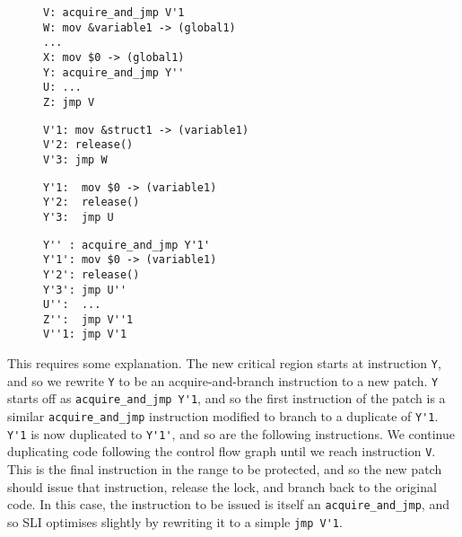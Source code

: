 \documentclass[10pt,twocolumn,preprint,natbib,authoryear]{sigplanconf}
\makeatletter
\newenvironment{subfloat}%
    {\def\caption##1{\gdef\subcapsave{\relax##1}}%
     \let\subcapsave=\@empty %
     \let\sf@oldlabel=\label
     \def\label##1{\xdef\sublabsave{\noexpand\label{##1}}}%
     \let\sublabsave\relax    %
     \setbox\subfigbox\hbox
       \bgroup}%
      {\egroup                %
     \let\label=\sf@oldlabel
     \subfigure[\subcapsave]{\box\subfigbox}}%
\makeatother
\begin{document}
\begin{figure}[h]
  \begin{subfloat}
    \begin{minipage}{90mm}
\begin{verbatim}
V: acquire_and_jmp V'1
W: mov &variable1 -> (global1)
...
X: mov $0 -> (global1)
Y: acquire_and_jmp Y''
U: ...
Z: jmp V
\end{verbatim}
    \end{minipage}
  \end{subfloat}
  \begin{subfloat}
    \begin{minipage}{90mm}
\begin{verbatim}
V'1: mov &struct1 -> (variable1)
V'2: release()
V'3: jmp W
\end{verbatim}
    \end{minipage}
  \end{subfloat}
  \begin{subfloat}
    \begin{minipage}{90mm}
\begin{verbatim}
Y'1:  mov $0 -> (variable1)
Y'2:  release()
Y'3:  jmp U
\end{verbatim}
    \end{minipage}
  \end{subfloat}
  \begin{subfloat}
    \begin{minipage}{90mm}
\begin{verbatim}
Y'' : acquire_and_jmp Y'1'
Y'1': mov $0 -> (variable1)
Y'2': release()
Y'3': jmp U''
U'':  ...
Z'':  jmp V''1
V''1: jmp V'1
\end{verbatim}
    \end{minipage}
  \end{subfloat}
  \caption{Complete patch based on the state machine in
    figure~\ref{fig:specialise_taken}, extending
    figure~\ref{fig:patch1}.}
  \label{fig:patch2}
\end{figure}

This requires some explanation.  The new critical region starts at
instruction \verb|Y|, and so we rewrite \verb|Y| to be an
acquire-and-branch instruction to a new patch.  \verb|Y| starts off as
\verb|acquire_and_jmp Y'1|, and so the first instruction of the patch
is a similar \verb|acquire_and_jmp| instruction modified to branch to
a duplicate of \verb|Y'1|.  \verb|Y'1| is now duplicated to
\verb|Y'1'|, and so are the following instructions.  We continue
duplicating code following the control flow graph until we reach
instruction \verb|V|.  This is the final instruction in the range to
be protected, and so the new patch should issue that instruction,
release the lock, and branch back to the original code.  In this case,
the instruction to be issued is itself an \verb|acquire_and_jmp|, and
so SLI optimises slightly by rewriting it to a simple \verb|jmp V'1|.
\end{document}
